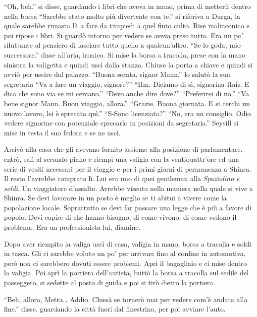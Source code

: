     ``Oh, beh.'' si disse, guardando i libri che
    aveva in mano, prima di metterli dentro nella borsa ``Sarebbe stato
    molto più divertente con te.'' si riferiva a Durga, la quale sarebbe
    rimasta là a fare da tirapiedi a quel finto culto. Rise malinconico e
    poi ripose i libri. Si guardò intorno per vedere se aveva preso tutto.
    Era un po' riluttante al pensiero di lasciare tutto quello a
    qualcun'altro. ``Se lo goda, mio successore.'' disse all'aria,
    ironico. Si mise la borsa a tracolla, prese con la mano sinistra la
    valigetta e quindi uscì dalla stanza. Chiuse la porta a chiave e quindi
    si avviò per uscire dal palazzo. ``Buona serata, signor Mann.'' lo
    salutò la sua segretaria ``Va a fare un viaggio, signore?'' ``Hm.
    Diciamo di sì, signorina Rais. E dica che sono via se mi cercano.''
    ``Devo anche dire dove?'' ``Preferirei di no.'' ``Va bene signor Mann.
    Buon viaggio, allora.'' ``Grazie. Buona giornata. E si cerchi un nuovo
    lavoro, lei è sprecata quì.'' ``S-Sono licenziata?'' ``No, era un
    consiglio. Odio vedere signorine con potenziale sprecarlo in posizioni
    da segretaria.'' Seysill si mise in testa il suo fedora e se ne uscì.

    Arrivò alla casa che gli avevano fornito assieme alla posizione di
    parlamentare, entrò, salì al secondo piano e riempì una valigia con la
    ventiquattr'ore ed una serie di vesiti necessari per il viaggio e per i
    primi giorni di permanenza a Shinra. Il resto l'avrebbe comprato lì.
    Lui era uno di quei gentleman alla \emph{Spaziolino e soldi}. Un
    viaggiatore d'assalto. Avrebbe vissuto nella maniera nella quale si
    vive a Shinra. Se devi lavorare in un posto è meglio se ti abitui a
    vivere come la popolazione locale. Soprattutto se devi far passare una
    legge che è più a favore di popolo. Devi capire di che hanno bisogno,
    di come vivono, di come vedono il problema. Era un professionista lui,
    diamine.

    Dopo aver riempito la valiga uscì di casa, valigia in mano, borsa a
    tracolla e soldi in tasca. Gli ci sarebbe voluto un po' per arrivare
    fino al confine in automotiva, però non ci sarebbero dovuti essere
    problemi. Aprì il bagagliaio e ci mise dentro la valigia. Poi aprì la
    portiera dell'autista, buttò la borsa a tracolla sul sedile del
    passeggero, si sedette al posto di guida e poi si tirò dietro la
    portiera.

    ``Beh, allora, Metra\dots{} Addio. Chissà se tornerò mai per vedere
    com'è andata alla fine.'' disse, guardando la città fuori dal
    finestrino, per poi avviare l'auto.

